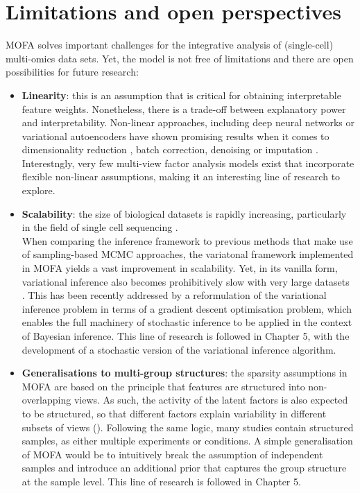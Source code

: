 \section{Limitations and open perspectives}

MOFA solves important challenges for the integrative analysis of (single-cell) multi-omics data sets. Yet, the model is not free of limitations and there are open possibilities for future research:

\begin{itemize}

	\item \textbf{Linearity}: this is an assumption that is critical for obtaining interpretable feature weights. Nonetheless, there is a trade-off between explanatory power and interpretability\cite{Kuhn}. Non-linear approaches, including deep neural networks or variational autoencoders have shown promising results when it comes to dimensionality reduction \cite{Lin2017,Ding2018,Lopez2018}, batch correction\cite{Lopez2018}, denoising \cite{Eraslan2019} or imputation \cite{Lin2016}. Interestngly, very few multi-view factor analysis models exist that incorporate flexible non-linear assumptions, making it an interesting line of research to explore.

	\item \textbf{Scalability}: the size of biological datasets is rapidly increasing, particularly in the field of single cell sequencing \cite{Svensson2018,Cao2019}. \\
	When comparing the inference framework to previous methods that make use of sampling-based MCMC approaches, the variatonal framework implemented in MOFA yields a vast improvement in scalability. Yet, in its vanilla form, variational inference also becomes prohibitively slow with very large datasets \cite{Hoffman2013,Blei2016,Hoffman2014}. This has been recently addressed by a reformulation of the variational inference problem in terms of a gradient descent optimisation problem, which enables the full machinery of stochastic inference to be applied in the context of Bayesian inference. This line of research is followed in Chapter 5, with the development of a stochastic version of the variational inference algorithm.

	\item \textbf{Generalisations to multi-group structures}: the sparsity assumptions in MOFA are based on the principle that features are structured into non-overlapping views. As such, the activity of the latent factors is also expected to be structured, so that different factors explain variability in different subsets of views (). Following the same logic, many studies contain structured samples, as either multiple experiments or conditions. A simple generalisation of MOFA would be to intuitively break the assumption of independent samples and introduce an additional prior that captures the group structure at the sample level. This line of research is followed in Chapter 5.


\end{itemize}
